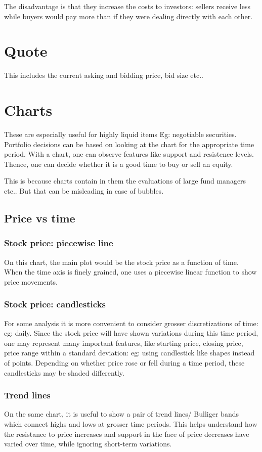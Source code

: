 \documentclass[oneside, article]{memoir}
\begin{document}
The disadvantage is that they increase the costs to investors: sellers receive less while buyers would pay more than if they were dealing directly with each other.

\section{Quote}
This includes the current asking and bidding price, bid size etc..

\section{Charts}
These are especially useful for highly liquid items Eg: negotiable securities. Portfolio decisions can be based on looking at the chart for the appropriate time period. With a chart, one can observe features like support and resistence levels. Thence, one can decide whether it is a good time to buy or sell an equity.

This is because charts contain in them the evaluations of large fund managers etc.. But that can be misleading in case of bubbles.

\subsection{Price vs time}
\subsubsection{Stock price: piecewise line}
On this chart, the main plot would be the stock price as a function of time. When the time axis is finely grained, one uses a piecewise linear function to show price movements.

\subsubsection{Stock price: candlesticks}
For some analysis it is more convenient to consider grosser discretizations of time: eg: daily. Since the stock price will have shown variations during this time period, one may represent many important features, like starting price, closing price, price range within a standard deviation: eg: using candlestick like shapes instead of points. Depending on whether price rose or fell during a time period, these candlesticks may be shaded differently.

\subsubsection{Trend lines}
On the same chart, it is useful to show a pair of trend lines/ Bulliger bands which connect highs and lows at grosser time periods. This helps understand how the resistance to price increases and support in the face of price decreases have varied over time, while ignoring short-term variations.
\end{document}
